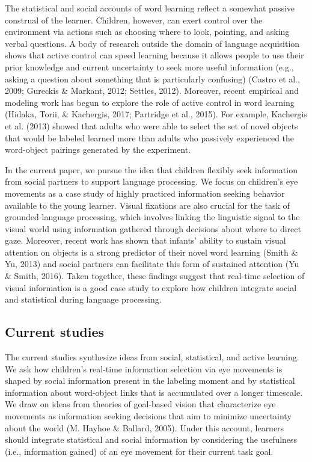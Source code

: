 \documentclass[oneside]{report}
\begin{document}
The statistical and social accounts of word learning reflect a somewhat
passive construal of the learner. Children, however, can exert control
over the environment via actions such as choosing where to look,
pointing, and asking verbal questions. A body of research outside the
domain of language acquisition shows that active control can speed
learning because it allows people to use their prior knowledge and
current uncertainty to seek more useful information (e.g., asking a
question about something that is particularly confusing) (Castro et al.,
2009; Gureckis \& Markant, 2012; Settles, 2012). Moreover, recent
empirical and modeling work has begun to explore the role of active
control in word learning (Hidaka, Torii, \& Kachergis, 2017; Partridge
et al., 2015). For example, Kachergis et al. (2013) showed that adults
who were able to select the set of novel objects that would be labeled
learned more than adults who passively experienced the word-object
pairings generated by the experiment.

In the current paper, we pursue the idea that children flexibly seek
information from social partners to support language processing. We
focus on children's eye movements as a case study of highly practiced
information seeking behavior available to the young learner. Visual
fixations are also crucial for the task of grounded language processing,
which involves linking the linguistic signal to the visual world using
information gathered through decisions about where to direct gaze.
Moreover, recent work has shown that infants' ability to sustain visual
attention on objects is a strong predictor of their novel word learning
(Smith \& Yu, 2013) and social partners can facilitate this form of
sustained attention (Yu \& Smith, 2016). Taken together, these findings
suggest that real-time selection of visual information is a good case
study to explore how children integrate social and statistical during
language processing.

\subsection{Current studies}\label{current-studies}

The current studies synthesize ideas from social, statistical, and
active learning. We ask how children's real-time information selection
via eye movements is shaped by social information present in the
labeling moment and by statistical information about word-object links
that is accumulated over a longer timescale. We draw on ideas from
theories of goal-based vision that characterize eye movements as
information seeking decisions that aim to minimize uncertainty about the
world (M. Hayhoe \& Ballard, 2005). Under this account, learners should
integrate statistical and social information by considering the
usefulness (i.e., information gained) of an eye movement for their
current task goal.
\end{document}
